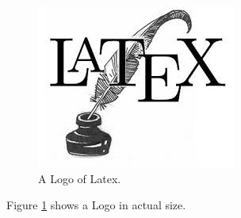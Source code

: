 \documentclass[a4paper, oneside, 12pt, parskip=half]{scrbook}
\begin{document}
\tableofcontents

\show\@textsuperscript

\makeatletter
\show\@textsuperscript
\makeatother

\makeatletter\show\m@th\makeatother


\begin{figure}
  \includegraphics[width=\linewidth]{latex.jpeg}
  \caption{A Logo of Latex.}
  \label{fig:Logo}
\end{figure}

Figure \ref{fig:Logo} shows a Logo in actual size.
\end{document}
